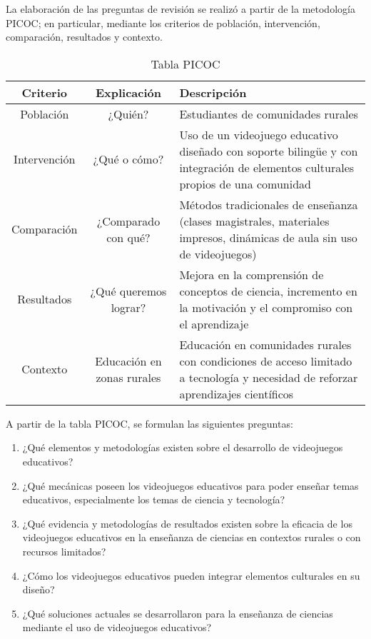 La elaboración de las preguntas de revisión se realizó a partir de la metodología PICOC; en particular, mediante los criterios de población, intervención, comparación, resultados y contexto.

\begin{table}[H]
    \centering
    \begin{tabularx}{\textwidth}{|c|c|X|}
        \hline
        Criterio & Explicación & Descripción \\ \hline
        Población & ¿Quién? & Estudiantes de comunidades rurales \\ \hline
        Intervención & ¿Qué o cómo? & Uso de un videojuego educativo diseñado con soporte bilingüe y con integración de elementos culturales propios de una comunidad \\ \hline
        Comparación & ¿Comparado con qué? & Métodos tradicionales de enseñanza (clases magistrales, materiales impresos, dinámicas de aula sin uso de videojuegos) \\ \hline
        Resultados & ¿Qué queremos lograr? & Mejora en la comprensión de conceptos de ciencia, incremento en la motivación y el compromiso con el aprendizaje \\ \hline
        Contexto & Educación en zonas rurales & Educación en comunidades rurales con condiciones de acceso limitado a tecnología y necesidad de reforzar aprendizajes científicos \\ \hline
    \end{tabularx}
    \caption{Tabla PICOC}
    \label{tab:placeholder}
\end{table}

A partir de la tabla PICOC, se formulan las siguientes preguntas:

\begin{enumerate}
    \item ¿Qué elementos y metodologías existen sobre el desarrollo de videojuegos educativos?
    \item ¿Qué mecánicas poseen los videojuegos educativos para poder enseñar temas educativos, especialmente los temas de ciencia y tecnología?
    \item ¿Qué evidencia y metodologías de resultados existen sobre la eficacia de los videojuegos educativos en la enseñanza de ciencias en contextos rurales o con recursos limitados?
    \item ¿Cómo los videojuegos educativos pueden integrar elementos culturales en su diseño?
    \item ¿Qué soluciones actuales se desarrollaron para la enseñanza de ciencias mediante el uso de videojuegos educativos?
\end{enumerate}

